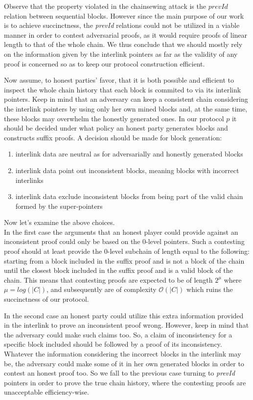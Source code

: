 Observe that the property violated in the chainsewing attack is the $prevId$ relation
between sequential blocks. However since the main purpose of our work is to achieve
succinctness, the \textit{prevId} relations could not be utilized in a viable manner
in order to contest adversarial proofs, as it would require proofs of linear length
to that of the whole chain.  We thus conclude that we should mostly rely on the
information given by the interlink pointers as far as the validity of any proof
is concerned so as to keep our protocol construction efficient.

Now assume, to honest parties' favor, that it is both possible and efficient to inspect
the whole chain history that each block is commited to via its interlink pointers. Keep
in mind that an adversary can keep a consistent chain considering the interlink pointers
by using only her own mined blocks and, at the same time, these blocks may overwhelm
the honestly generated ones. In our protocol $p$ it should be decided  under what policy
an honest party generates blocks and constructs suffix proofs. A decision should be made
for block generation:
\begin{enumerate}
\item interlink data are neutral as for adversarially and honestly generated blocks
\item interlink data point out inconsistent blocks, meaning blocks with incorrect
interlinks\item interlink data exclude inconsistent blocks from being part of the
valid chain formed by the super-pointers
\end{enumerate}
Now let's examine the above choices. \\
In the first case the arguments that an honest player could provide against an
inconsistent proof could only be based on the 0-level pointers. Such a contesting
proof should at least provide the 0-level subchain of length equal to the
following: starting from a block included in the suffix proof and is not a
block of the chain until the closest block included in the suffix proof and is
a valid block of the chain. This means that contesting proofs are expected to
be of length $2^\mu$ where $\mu = log(|C|)$, and subsequently are of complexity
$\mathcal{O}(|C|)$ which ruins the succinctness of our protocol.

In the second case an honest party could utilize this extra information provided
in the interlink to prove an inconsistent proof wrong. However, keep in mind that
the adversary could make such claims too. So, a claim of inconsistency for a
specific block included should be followed by a proof of its inconsistency.
Whatever the information considering the incorrect blocks in the interlink may
be, the adversary could make some of it in her own generated blocks in order to
contest an honest proof too. So we fall to the previous case turning to
\textit{prevId} pointers in order to prove the true chain history, where the
contesting proofs are unacceptable efficiency-wise.

